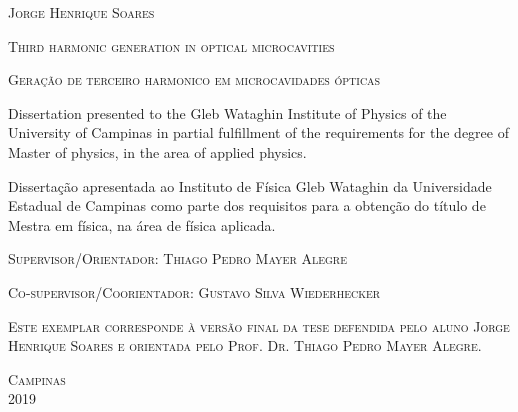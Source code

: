 \newpage
\thispagestyle{empty}

\vspace*{0.6cm}
\begin{center}
\textsc{\large Jorge Henrique Soares}
\end{center}


\vspace*{0.6cm}

\begin{center}
\textsc{\Large Third harmonic generation in optical microcavities}
\end{center}

\vspace*{0.3cm}

\begin{center}
\textsc{\large Geração de terceiro harmonico em microcavidades ópticas}
\end{center}

\vspace*{0.6cm}

\begin{flushright}
\begin{minipage}{8.0cm}
Dissertation presented to the Gleb Wataghin Institute of Physics of the University of Campinas in partial fulfillment of the requirements for the degree of Master of physics, in the area of applied physics.

\vspace*{0.3cm}

Dissertação apresentada ao Instituto de Física Gleb Wataghin da Universidade Estadual de Campinas como parte dos requisitos para a obtenção do título de Mestra em física, na área de física aplicada.

\end{minipage}
\end{flushright}

\vspace*{0.8cm}
\begin{flushleft}
	\hspace{0.3cm} \textsc{Supervisor/Orientador: Thiago Pedro Mayer Alegre}
	
	\hspace{0.3cm} \textsc{Co-supervisor/Coorientador: Gustavo Silva Wiederhecker}
\end{flushleft}

\vspace*{0.5cm}

\begin{minipage}{7cm}
\scriptsize \textsc{Este exemplar corresponde à versão final da tese defendida pelo aluno Jorge Henrique Soares e orientada pelo Prof. Dr. Thiago Pedro Mayer Alegre.}
\end{minipage}

\vspace*{0.5cm}

\null \vfill
\begin{center}
\textsc{\large Campinas\\2019}
\end{center}




